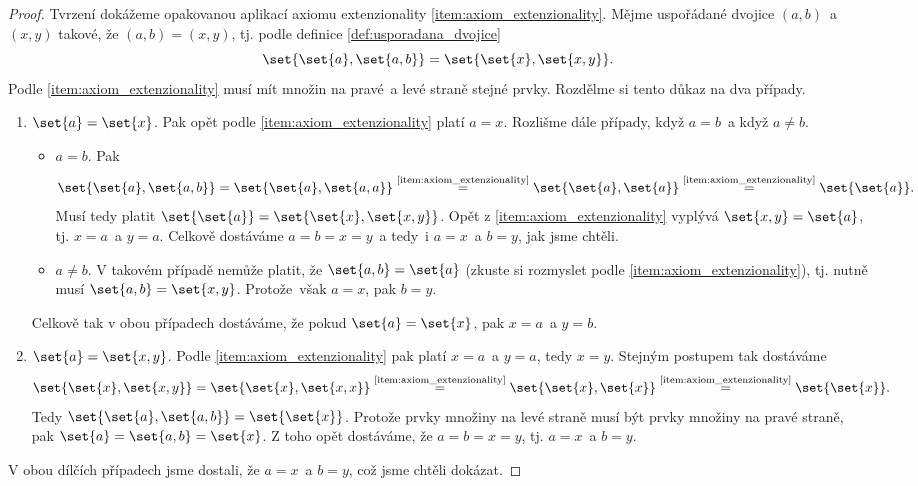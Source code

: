 \begin{proof}
    Tvrzení dokážeme opakovanou aplikací axiomu extenzionality \ref{item:axiom_extenzionality}. Mějme uspořádané dvojice $(a,b)$~a $(x,y)$ takové, že $(a,b)=(x,y)$, tj. podle definice \ref{def:usporadana_dvojice}
    \begin{equation*}
        \set{\set{a},\set{a,b}}=\set{\set{x},\set{x,y}}.
    \end{equation*}
    Podle \ref{item:axiom_extenzionality} musí mít množin na pravé~a levé straně stejné prvky. Rozdělme si tento důkaz na dva případy.
    \begin{enumerate}[label=(\alph*)]
        \item $\set{a}=\set{x}$. Pak opět podle \ref{item:axiom_extenzionality} platí $a=x$. Rozlišme dále případy, když $a=b$~a když $a\neq b$.
        \begin{itemize}
            \item $a=b$. Pak
            \begin{equation*}
                \set{\set{a},\set{a,b}}=\set{\set{a},\set{a,a}}\stackrel{\text{\ref{item:axiom_extenzionality}}}{=}\set{\set{a},\set{a}}\stackrel{\text{\ref{item:axiom_extenzionality}}}{=}\set{\set{a}}.
            \end{equation*}
            Musí tedy platit $\set{\set{a}}=\set{\set{x},\set{x,y}}$. Opět z \ref{item:axiom_extenzionality} vyplývá $\set{x,y}=\set{a}$, tj. $x=a$~a $y=a$. Celkově dostáváme $a=b=x=y$~a tedy~i $a=x$~a $b=y$, jak jsme chtěli.
            \item $a\neq b$. V takovém případě nemůže platit, že $\set{a,b}=\set{a}$ (zkuste si rozmyslet podle \ref{item:axiom_extenzionality}), tj. nutně musí $\set{a,b}=\set{x,y}$. Protože~však $a=x$, pak $b=y$.
        \end{itemize}
        Celkově tak v obou případech dostáváme, že pokud $\set{a}=\set{x}$, pak $x=a$~a $y=b$.
        \item $\set{a}=\set{x,y}$. Podle \ref{item:axiom_extenzionality} pak platí $x=a$~a $y=a$, tedy $x=y$. Stejným postupem tak dostáváme
        \begin{equation*}
            \set{\set{x},\set{x,y}}=\set{\set{x},\set{x,x}}\stackrel{\text{\ref{item:axiom_extenzionality}}}{=}\set{\set{x},\set{x}}\stackrel{\text{\ref{item:axiom_extenzionality}}}{=}\set{\set{x}}.
        \end{equation*}
        Tedy $\set{\set{a},\set{a,b}}=\set{\set{x}}$. Protože prvky množiny na levé straně musí být prvky množiny na pravé straně, pak $\set{a}=\set{a,b}=\set{x}$. Z toho opět dostáváme, že $a=b=x=y$, tj. $a=x$~a $b=y$.
    \end{enumerate}
    V obou dílčích případech jsme dostali, že $a=x$~a $b=y$, což jsme chtěli dokázat.
\end{proof}